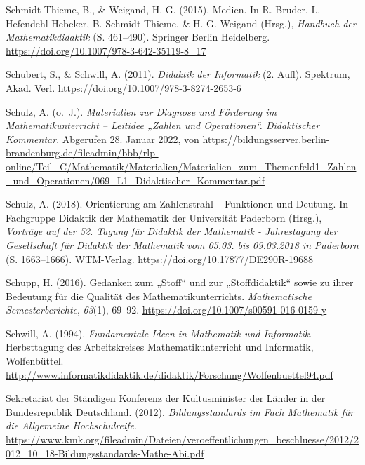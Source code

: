 \documentclass[
  ngerman,
]{scrbook}
\newlength{\cslhangindent}
\newlength{\cslentryspacingunit} %
\newenvironment{CSLReferences}[2] %
 {%
  \setlength{\parindent}{0pt}
  \ifodd #1
  \let\oldpar\par
  \def\par{\hangindent=\cslhangindent\oldpar}
  \fi
  \setlength{\parskip}{#2\cslentryspacingunit}
 }%
 {}
\theoremstyle{definition}
\theoremstyle{definition}
\theoremstyle{definition}
\theoremstyle{definition}
\theoremstyle{remark}
\begin{document}
\begin{CSLReferences}{1}{0}
\leavevmode{}%
Schmidt-Thieme, B., \& Weigand, H.-G. (2015). Medien. In R. Bruder, L. Hefendehl-Hebeker, B. Schmidt-Thieme, \& H.-G. Weigand (Hrsg.), \emph{Handbuch der {Mathematikdidaktik}} (S. 461--490). Springer Berlin Heidelberg. \url{https://doi.org/10.1007/978-3-642-35119-8_17}

\leavevmode{}%
Schubert, S., \& Schwill, A. (2011). \emph{Didaktik der {Informatik}} (2. Aufl). Spektrum, Akad. Verl. \url{https://doi.org/10.1007/978-3-8274-2653-6}

\leavevmode{}%
Schulz, A. (o.~J.). \emph{Materialien zur {Diagnose} und {Förderung} im {Mathematikunterricht} -- {Leitidee} „{Zahlen} und {Operationen}``. {Didaktischer} {Kommentar}}. Abgerufen 28. Januar 2022, von \url{https://bildungsserver.berlin-brandenburg.de/fileadmin/bbb/rlp-online/Teil_C/Mathematik/Materialien/Materialien_zum_Themenfeld1_Zahlen_und_Operationen/069_L1_Didaktischer_Kommentar.pdf}

\leavevmode{}%
Schulz, A. (2018). Orientierung am {Zahlenstrahl} -- {Funktionen} und {Deutung}. In Fachgruppe Didaktik der Mathematik der Universität Paderborn (Hrsg.), \emph{Vorträge auf der 52. Tagung für Didaktik der Mathematik - Jahrestagung der Gesellschaft für Didaktik der Mathematik vom 05.03. bis 09.03.2018 in Paderborn} (S. 1663--1666). WTM-Verlag. \url{https://doi.org/10.17877/DE290R-19688}

\leavevmode{}%
Schupp, H. (2016). Gedanken zum „{Stoff}`` und zur „{Stoffdidaktik}`` sowie zu ihrer {Bedeutung} für die {Qualität} des {Mathematikunterrichts}. \emph{Mathematische Semesterberichte}, \emph{63}(1), 69--92. \url{https://doi.org/10.1007/s00591-016-0159-y}

\leavevmode{}%
Schwill, A. (1994). \emph{Fundamentale {Ideen} in {Mathematik} und {Informatik}}. Herbsttagung des Arbeitskreises Mathematikunterricht und Informatik, Wolfenbüttel. \url{http://www.informatikdidaktik.de/didaktik/Forschung/Wolfenbuettel94.pdf}

\leavevmode{}%
Sekretariat der Ständigen Konferenz der Kultusminister der Länder in der Bundesrepublik Deutschland. (2012). \emph{Bildungsstandards im {Fach} {Mathematik} für die {Allgemeine} {Hochschulreife}}. \url{https://www.kmk.org/fileadmin/Dateien/veroeffentlichungen_beschluesse/2012/2012_10_18-Bildungsstandards-Mathe-Abi.pdf}


\end{CSLReferences}
\end{document}
